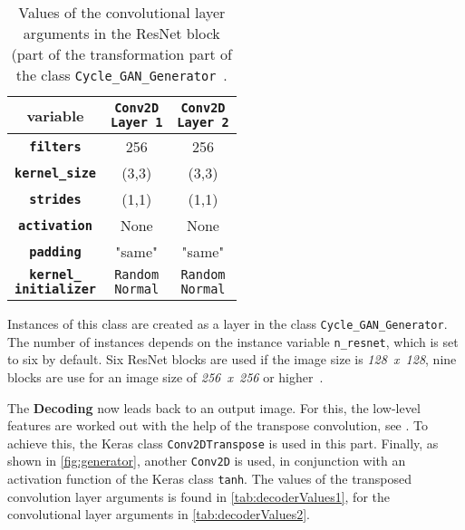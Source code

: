 \documentclass[fleqn,10pt]{SelfArx} %
\begin{document}
\begin{table}[htb]
\centering
\caption{Values of the convolutional layer arguments in the \ac{ResNet} block (part of the transformation part of the class \texttt{Cycle\_GAN\-\_Gene\-rator}~\cite{image-to-image-ccan}.}
\label{tab:transformerValues}
\begin{tabular}{c c c}
\textbf{variable} & \makecell[cc]{\textbf{\texttt{Conv2D}} \\ \textbf{\texttt{Layer 1}}} & \makecell[cc]{\textbf{\texttt{Conv2D}} \\ \textbf{\texttt{Layer 2}}} \\ \hline
\textbf{\texttt{filters}} & 256 & 256 \\ \hline
\textbf{\texttt{kernel\_size}} & (3,3) & (3,3) \\ \hline
\textbf{\texttt{strides}} & (1,1) &  (1,1) \\ \hline
\textbf{\texttt{activation}} & None & None \\ \hline 
\textbf{\texttt{padding}} & "same" & "same" \\ \hline
\makecell[cc]{\textbf{\texttt{kernel\_}} \\ \textbf{\texttt{initializer}}} & \makecell[cc]{\texttt{Random} \\ \texttt{Normal}} & \makecell[cc]{\texttt{Random} \\ \texttt{Normal}} \\ \hline
\end{tabular}
\end{table}

Instances of this class are created as a layer in the class \texttt{Cycle\_GAN\-\_Generator}. The number of instances depends on the instance variable \texttt{n\_resnet}, which is set to six by default. Six \ac{ResNet} blocks are used if the image size is \textit{128~x~128}, nine blocks are use for an image size of \textit{256~x~256} or higher~\cite{image-to-image-ccan}.

The \textbf{Decoding} now leads back to an output image. For this, the low-level features are worked out with the help of the transpose convolution, see \cite{Introduction-to-Cycle-GANs}. To achieve this, the Keras class \texttt{Conv2DTranspose} is used in this part. Finally, as shown in \autoref{fig:generator}, another \texttt{Conv2D} is used, in conjunction with an activation function of the Keras class \texttt{tanh}. The values of the transposed convolution layer arguments is found in \autoref{tab:decoderValues1}, for the convolutional layer arguments in \autoref{tab:decoderValues2}.
\end{document}
